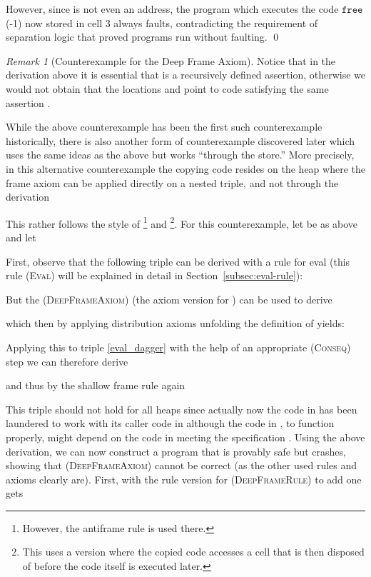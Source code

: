 \documentclass{LMCS}
\theoremstyle{remark}
\newtheorem{remark}[theorem]{Remark}
\newcommand{\SYN}[1]{\ensuremath{\texttt{#1}}}
\begin{document}
However, since  is not even an address, the program  which executes the code \SYN{free}(-1)   now stored in cell 3 always faults, contradicting the requirement of separation logic that proved programs
run without faulting.
\qed



\begin{remark}[Counterexample for the Deep Frame Axiom]
Notice that in the derivation above  it is essential that  is a recursively defined assertion, otherwise we would not obtain that the locations  and  point to code satisfying the same  assertion .

While the above counterexample has been the first such counterexample historically, there is also another   form of counterexample discovered later which  uses the same ideas as the above but works ``through the store.'' More precisely,  in this alternative counterexample the copying code  resides on the heap where the frame axiom  can  be applied directly on a nested triple, and not through the derivation 

This rather follows the style of  \cite{Pottier09}\footnote{However, the antiframe rule is used there.} and \cite{CharltonReusLola10}\footnote{This uses a version where the copied code accesses a cell that is then disposed of before the code itself is executed later.}. For this counterexample, let  be as above and let
 
  First, observe that the following triple can be derived with  a rule for eval (this rule  \textsc{(Eval)} will be explained in detail in Section~\ref{subsec:eval-rule}):
 

 But the  (\textsc{DeepFrameAxiom}) (the axiom version for )  can be used to derive

 which then  by applying distribution axioms unfolding the definition of  yields:
  
 Applying this to triple \eqref{eval_dagger} with the help of an appropriate (\textsc{Conseq}) step we can therefore derive

and thus by the shallow frame rule again

This  triple   should not hold for all heaps since actually now the code in  has been laundered to work with its caller code in  although  the code in , to function properly, might depend on the code in  meeting the specification .  Using the above derivation, we can now construct a program that is provably safe but crashes, showing that (\textsc{DeepFrameAxiom}) cannot be correct (as the other used rules and axioms clearly are). First, with the rule version for  (\textsc{DeepFrameRule}) to add  one   gets



\end{remark}
\end{document}
